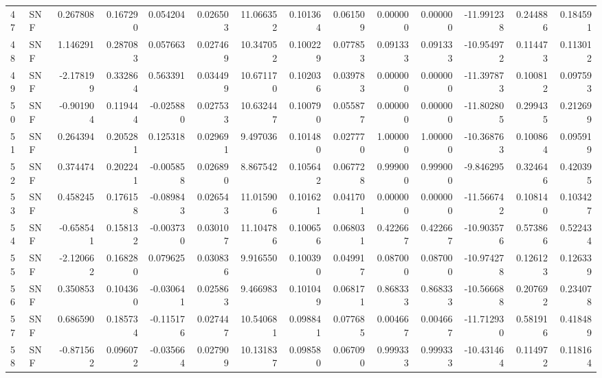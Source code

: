 \begin{tabular}{llrrrrrrrrrrrr}
47  &    SNF &  0.267808 &      0.167290 &  0.054204 &    0.026503 &  11.066352 &      0.101364 &   0.061509 &  0.000000 &  0.000000 & -11.991238 &     0.244886 &     0.184591 \\
48  &    SNF &  1.146291 &      0.287083 &  0.057663 &    0.027469 &  10.347052 &      0.100229 &   0.077853 &  0.091333 &  0.091333 & -10.954972 &     0.114473 &     0.113012 \\
49  &    SNF & -2.178199 &      0.332864 &  0.563391 &    0.034499 &  10.671170 &      0.102036 &   0.039783 &  0.000000 &  0.000000 & -11.397873 &     0.100812 &     0.097593 \\
50  &    SNF & -0.901904 &      0.119444 & -0.025880 &    0.027533 &  10.632447 &      0.100790 &   0.055877 &  0.000000 &  0.000000 & -11.802805 &     0.299435 &     0.212699 \\
51  &    SNF &  0.264394 &      0.205281 &  0.125318 &    0.029691 &   9.497036 &      0.101480 &   0.027770 &  1.000000 &  1.000000 & -10.368763 &     0.100864 &     0.095919 \\
52  &    SNF &  0.374474 &      0.202241 & -0.005858 &    0.026890 &   8.867542 &      0.105642 &   0.067728 &  0.999000 &  0.999000 &  -9.846295 &     0.324646 &     0.420395 \\
53  &    SNF &  0.458245 &      0.176158 & -0.089843 &    0.026543 &  11.015906 &      0.101621 &   0.041701 &  0.000000 &  0.000000 & -11.566742 &     0.108140 &     0.103427 \\
54  &    SNF & -0.658541 &      0.158132 & -0.003730 &    0.030107 &  11.104786 &      0.100656 &   0.068031 &  0.422667 &  0.422667 & -10.903576 &     0.573866 &     0.522434 \\
55  &    SNF & -2.120662 &      0.168280 &  0.079625 &    0.030836 &   9.916550 &      0.100390 &   0.049917 &  0.087000 &  0.087000 & -10.974278 &     0.126123 &     0.126339 \\
56  &    SNF &  0.350853 &      0.104360 & -0.030641 &    0.025863 &   9.466983 &      0.101049 &   0.068171 &  0.868333 &  0.868333 & -10.566688 &     0.207692 &     0.234078 \\
57  &    SNF &  0.686590 &      0.185734 & -0.115176 &    0.027447 &  10.540681 &      0.098841 &   0.077685 &  0.004667 &  0.004667 & -11.712930 &     0.581916 &     0.418489 \\
58  &    SNF & -0.871562 &      0.096072 & -0.035664 &    0.027909 &  10.131837 &      0.098580 &   0.067090 &  0.999333 &  0.999333 & -10.431464 &     0.114972 &     0.118164 \\

\end{tabular}
